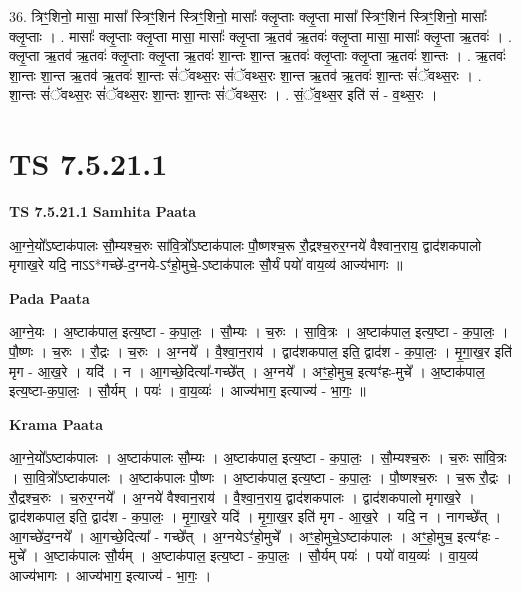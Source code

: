 \documentclass[17pt]{extarticle}
\begin{document}
36. त्रिꣳ॒॒शिनो॒ मासा॒ मासा᳚ स्त्रिꣳ॒॒शिन॑ स्त्रिꣳ॒॒शिनो॒ मासाः᳚ क्लृ॒प्ताः क्लृ॒प्ता मासा᳚ स्त्रिꣳ॒॒शिन॑ 
स्त्रिꣳ॒॒शिनो॒ मासाः᳚ क्लृ॒प्ताः । . मासाः᳚ क्लृ॒प्ताः क्लृ॒प्ता मासा॒ मासाः᳚ क्लृ॒प्ता ऋ॒तव॑ ऋ॒तवः॑ क्लृ॒प्ता मासा॒ मासाः᳚ क्लृ॒प्ता ऋ॒तवः॑ । . क्लृ॒प्ता ऋ॒तव॑ ऋ॒तवः॑ क्लृ॒प्ताः क्लृ॒प्ता ऋ॒तवः॑ शा॒न्तः शा॒न्त ऋ॒तवः॑ क्लृ॒प्ताः क्लृ॒प्ता ऋ॒तवः॑ शा॒न्तः । . ऋ॒तवः॑ शा॒न्तः शा॒न्त ऋ॒तव॑ ऋ॒तवः॑ शा॒न्तः सं॑ॅवथ्स॒रः सं॑ॅवथ्स॒रः शा॒न्त ऋ॒तव॑ ऋ॒तवः॑ शा॒न्तः सं॑ॅवथ्स॒रः । . शा॒न्तः सं॑ॅवथ्स॒रः सं॑ॅवथ्स॒रः शा॒न्तः शा॒न्तः सं॑ॅवथ्स॒रः । . सं॒ॅव॒थ्स॒र इति॑ सं - व॒थ्स॒रः । \newline
\pagebreak
{}

\section{ TS 7.5.21.1 }

\textbf{TS 7.5.21.1 } \newline
\textbf{Samhita Paata} \newline

आ॒ग्ने॒यो᳚ऽष्टाक॑पालः सौ॒म्यश्च॒रुः सा॑वि॒त्रो᳚ऽष्टाक॑पालः पौ॒ष्णश्च॒रू रौ॒द्रश्च॒रुर॒ग्नये॑ वैश्वान॒राय॒ द्वाद॑शकपालो मृगाख॒रे यदि॒ नाऽऽ*गच्छे॑-द॒ग्नये-ऽꣳ॑हो॒मुचे॒-ऽष्टाक॑पालः सौ॒र्यं पयो॑ वाय॒व्य॑ आज्य॑भागः ॥ \newline

\textbf{Pada Paata} \newline

आ॒ग्ने॒यः । अ॒ष्टाक॑पाल॒ इत्य॒ष्टा - क॒पा॒लः॒ । सौ॒म्यः । च॒रुः । सा॒वि॒त्रः । अ॒ष्टाक॑पाल॒ इत्य॒ष्टा - क॒पा॒लः॒ । पौ॒ष्णः । च॒रुः । रौ॒द्रः । च॒रुः । अ॒ग्नये᳚ । वै॒श्वा॒न॒राय॑ । द्वाद॑शकपाल॒ इति॒ द्वाद॑श - क॒पा॒लः॒ । मृ॒गा॒ख॒र इति॑ मृग - आ॒ख॒रे । यदि॑ । न । आ॒गच्छे॒दित्या᳚-गच्छे᳚त् । अ॒ग्नये᳚ । अꣳ॒॒हो॒मुच॒ इत्यꣳ॑हः-मुचे᳚ । अ॒ष्टाक॑पाल॒ इत्य॒ष्टा-क॒पा॒लः॒ । सौ॒र्यम् । पयः॑ । वा॒य॒व्यः॑ । आज्य॑भाग॒ इत्याज्य॑ - भा॒गः॒ ॥  \newline


\textbf{Krama Paata} \newline

आ॒ग्ने॒यो᳚ऽष्टाक॑पालः । अ॒ष्टाक॑पालः सौ॒म्यः । अ॒ष्टाक॑पाल॒ इत्य॒ष्टा - क॒पा॒लः॒ । सौ॒म्यश्च॒रुः । च॒रुः सा॑वि॒त्रः । सा॒वि॒त्रो᳚ऽष्टाक॑पालः । अ॒ष्टाक॑पालः पौ॒ष्णः । अ॒ष्टाक॑पाल॒ इत्य॒ष्टा - क॒पा॒लः॒ । पौ॒ष्णश्च॒रुः । च॒रू रौ॒द्रः । रौ॒द्रश्च॒रुः । च॒रुर॒ग्नये᳚ । अ॒ग्नये॑ वैश्वान॒राय॑ । वै॒श्वा॒न॒राय॒ द्वाद॑शकपालः । द्वाद॑शकपालो मृगाख॒रे । द्वाद॑शकपाल॒ इति॒ द्वाद॑श - क॒पा॒लः॒ । मृ॒गा॒ख॒रे यदि॑ । मृ॒गा॒ख॒र इति॑ मृग - आ॒ख॒रे । यदि॒ न । नागच्छे᳚त् । आ॒गच्छे॑द॒ग्नये᳚ । आ॒गच्छे॒दित्या᳚ - गच्छे᳚त् । अ॒ग्नयेऽꣳ॑हो॒मुचे᳚ । अꣳ॒॒हो॒मुचे॒ऽष्टाक॑पालः । अꣳ॒॒हो॒मुच॒ इत्यꣳ॑हः - मुचे᳚ । अ॒ष्टाक॑पालः सौ॒र्यम् । अ॒ष्टाक॑पाल॒ इत्य॒ष्टा - क॒पा॒लः॒ । सौ॒र्यम् पयः॑ । पयो॑ वाय॒व्यः॑ । वा॒य॒व्य॑ आज्य॑भागः । आज्य॑भाग॒ इत्याज्य॑ - भा॒गः॒ । \newline
\end{document}
